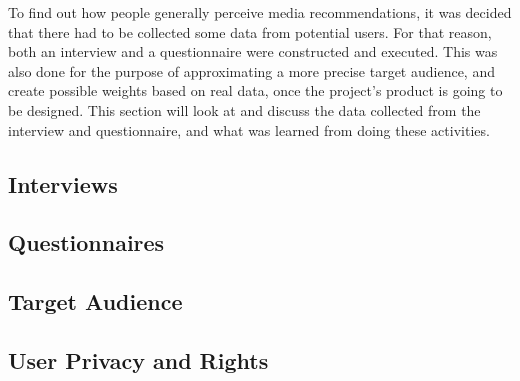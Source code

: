 To find out how people generally perceive media recommendations, it was decided that there had to be collected some data from potential users. For that reason, both an interview and a questionnaire were constructed and executed. This was also done for the purpose of approximating a more precise target audience, and create possible weights based on real data, once the project’s product is going to be designed. This section will look at and discuss the data collected from the interview and questionnaire, and what was learned from doing these activities.
\subsection{Interviews}
\label{Interview}

\subsection{Questionnaires}
\label{Question}

\subsection{Target Audience}
\label{TargetAudience}

\subsection{User Privacy and Rights}
\label{User Rights}
